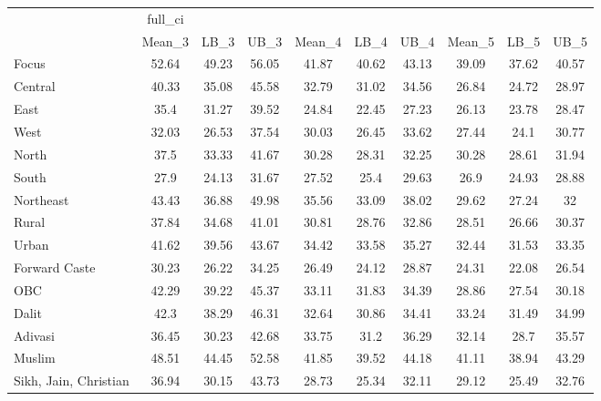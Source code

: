 \begin{tabular}{l*{9}{c}}
\hline\hline
            &     full\_ci&            &            &            &            &            &            &            &            \\
            &      Mean\_3&        LB\_3&        UB\_3&      Mean\_4&        LB\_4&        UB\_4&      Mean\_5&        LB\_5&        UB\_5\\
\hline
Focus       &       52.64&       49.23&       56.05&       41.87&       40.62&       43.13&       39.09&       37.62&       40.57\\
Central     &       40.33&       35.08&       45.58&       32.79&       31.02&       34.56&       26.84&       24.72&       28.97\\
East        &        35.4&       31.27&       39.52&       24.84&       22.45&       27.23&       26.13&       23.78&       28.47\\
West        &       32.03&       26.53&       37.54&       30.03&       26.45&       33.62&       27.44&        24.1&       30.77\\
North       &        37.5&       33.33&       41.67&       30.28&       28.31&       32.25&       30.28&       28.61&       31.94\\
South       &        27.9&       24.13&       31.67&       27.52&        25.4&       29.63&        26.9&       24.93&       28.88\\
Northeast   &       43.43&       36.88&       49.98&       35.56&       33.09&       38.02&       29.62&       27.24&          32\\
Rural       &       37.84&       34.68&       41.01&       30.81&       28.76&       32.86&       28.51&       26.66&       30.37\\
Urban       &       41.62&       39.56&       43.67&       34.42&       33.58&       35.27&       32.44&       31.53&       33.35\\
Forward Caste&       30.23&       26.22&       34.25&       26.49&       24.12&       28.87&       24.31&       22.08&       26.54\\
OBC         &       42.29&       39.22&       45.37&       33.11&       31.83&       34.39&       28.86&       27.54&       30.18\\
Dalit       &        42.3&       38.29&       46.31&       32.64&       30.86&       34.41&       33.24&       31.49&       34.99\\
Adivasi     &       36.45&       30.23&       42.68&       33.75&        31.2&       36.29&       32.14&        28.7&       35.57\\
Muslim      &       48.51&       44.45&       52.58&       41.85&       39.52&       44.18&       41.11&       38.94&       43.29\\
Sikh, Jain, Christian&       36.94&       30.15&       43.73&       28.73&       25.34&       32.11&       29.12&       25.49&       32.76\\
\hline\hline
\end{tabular}

